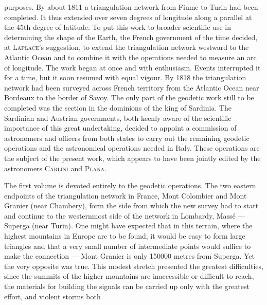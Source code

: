%
purposes. By about 1811 a triangulation network from Fiume to Turin had been completed. It thus extended over seven degrees of longitude along a parallel at the 45th degree of latitude. To put this work to broader scientific use in determining the shape of the Earth, the French government of the time decided, at \textsc{Laplace}’s suggestion, to extend the triangulation network westward to the Atlantic Ocean and to combine it with the operations needed to measure an arc of longitude. The work began at once and with enthusiasm. Events interrupted it for a time, but it soon resumed with equal vigour. By 1818 the triangulation network had been surveyed across French territory from the Atlantic Ocean near Bordeaux to the border of Savoy. The only part of the geodetic work still to be completed was the section in the dominions of the king of Sardinia. The Sardinian and Austrian governments, both keenly aware of the scientific importance of this great undertaking, decided to appoint a commission of astronomers and officers from both states to carry out the remaining geodetic operations and the astronomical operations needed in Italy. These operations are the subject of the present work, which appears to have been jointly edited by the astronomers \textsc{Carlini} and \textsc{Plana}.

The first volume is devoted entirely to the geodetic operations. The two eastern endpoints of the triangulation network in France, Mont Colombier and Mont Granier (near Chambery), form the side from which the new survey had to start and continue to the westernmost side of the network in Lombardy, Massé --- Superga (near Turin). One might have expected that in this terrain, where the highest mountains in Europe are to be found, it would be easy to form large triangles and that a very small number of intermediate points would suffice to make the connection --- Mont Granier is only 150000 metres from Superga. Yet the very opposite was true. This modest stretch presented the greatest difficulties, since the summits of the higher mountains are inaccessible or difficult to reach, the materials for building the signals can be carried up only with the greatest effort, and violent storms both
